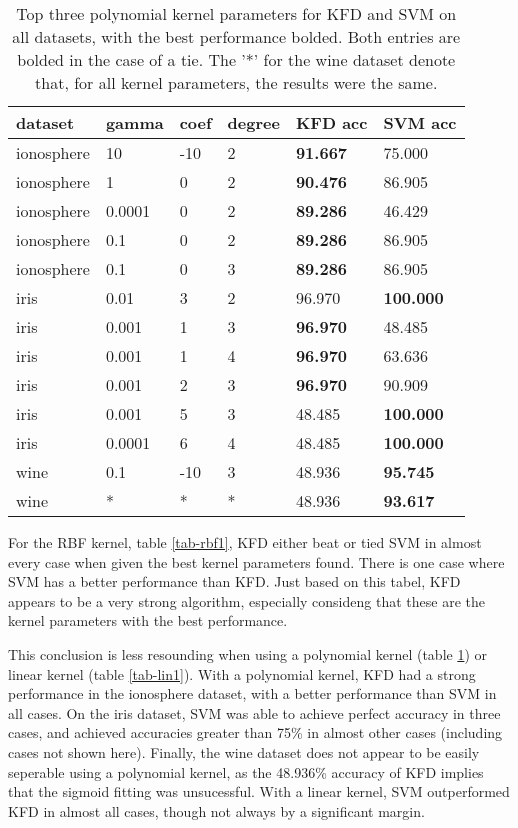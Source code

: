 \documentclass[12pt]{article}
\begin{document}
\begin{table}[ht]
\begin{tabular}{l || p{2cm} | p{2cm} | p{2cm} | p{2cm} |  p{2cm}}
dataset & gamma & coef & degree & KFD acc & SVM acc\\
\hline
\hline
ionosphere & 10 & -10 & 2 & \textbf{91.667} & 75.000 \\ 
ionosphere & 1 & 0 & 2 & \textbf{90.476} & 86.905 \\ 
ionosphere & 0.0001 & 0 & 2 & \textbf{89.286} & 46.429 \\ 
ionosphere  & 0.1 & 0 & 2 & \textbf{89.286} & 86.905 \\ 
ionosphere  & 0.1 & 0 & 3 & \textbf{89.286} & 86.905 \\ 
\hline
iris & 0.01 & 3 & 2 & 96.970 & \textbf{100.000} \\ 
iris  & 0.001 & 1 & 3 & \textbf{96.970} & 48.485 \\ 
iris  & 0.001 & 1 & 4 & \textbf{96.970} & 63.636 \\ 
iris & 0.001 & 2 & 3 & \textbf{96.970} & 90.909 \\ 
iris & 0.001 & 5 & 3 & 48.485 & \textbf{100.000} \\ 
iris & 0.0001 & 6 & 4 & 48.485 & \textbf{100.000} \\ 
\hline
wine & 0.1 & -10 & 3 & 48.936 & \textbf{95.745} \\ 
wine & * & * & * &  48.936 & \textbf{93.617}\\
\end{tabular}
\caption{Top three polynomial kernel parameters for KFD and SVM on all datasets, with the best performance bolded.  Both entries are bolded in the case of a tie. The '*' for the wine dataset denote that, for all kernel parameters, the results were the same.}
\label{tab-poly1}
\end{table}

For the RBF kernel, table \ref{tab-rbf1}, KFD either beat or tied SVM in almost every case when given the best kernel parameters found.  There is one case where SVM has a better performance than KFD.  Just based on this tabel, KFD appears to be a very strong algorithm, especially consideng that these are the kernel parameters with the best performance.

This conclusion is less resounding when using a polynomial kernel (table \ref{tab-poly1}) or linear kernel (table \ref{tab-lin1}).  With a polynomial kernel, KFD had a strong performance in the ionosphere dataset, with a better performance than SVM in all  cases.  On the iris dataset, SVM was able to achieve perfect accuracy in three cases, and achieved accuracies greater than 75\% in almost other cases (including cases not shown here).  Finally, the wine dataset does not appear to be easily seperable using a polynomial kernel, as the 48.936\% accuracy of KFD implies that the sigmoid fitting was unsucessful.  With a linear kernel, SVM outperformed KFD in almost all cases, though not always by a significant margin.
\end{document}
